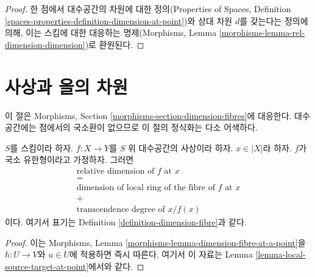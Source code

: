 \begin{proof}
한 점에서 대수공간의 차원에 대한 정의(Properties of Spaces,
Definition \ref{spaces-properties-definition-dimension-at-point})와
상대 차원 $d$를 갖는다는 정의에 의해, 이는 스킴에 대한 대응하는
명제(Morphisms, Lemma
\ref{morphisms-lemma-rel-dimension-dimension})로 환원된다.
\end{proof}







\section{사상과 올의 차원}
\label{section-dimension-fibres}

\noindent
이 절은 Morphisms, Section
\ref{morphisms-section-dimension-fibres}에 대응한다.
대수공간에는 점에서의 국소환이 없으므로 이 절의 정식화는 다소
어색하다.

\begin{lemma}
\label{lemma-dimension-fibre-at-a-point}
$S$를 스킴이라 하자.
$f : X \to Y$를 $S$ 위 대수공간의 사상이라 하자.
$x \in |X|$라 하자.
$f$가 국소 유한형이라고 가정하자. 그러면
$$
\begin{matrix}
\text{relative dimension of }f\text{ at }x \\
= \\
\text{dimension of local ring of the fibre of }f\text{ at }x \\
+ \\
\text{transcendence degree of }x/f(x)
\end{matrix}
$$
이다. 여기서 표기는 Definition \ref{definition-dimension-fibre}과 같다.
\end{lemma}

\begin{proof}
이는 Morphisms, Lemma
\ref{morphisms-lemma-dimension-fibre-at-a-point}을
$h : U \to V$와 $u \in U$에 적용하면 즉시 따른다. 여기서 이 자료는
Lemma \ref{lemma-local-source-target-at-point}에서와 같다.
\end{proof}

